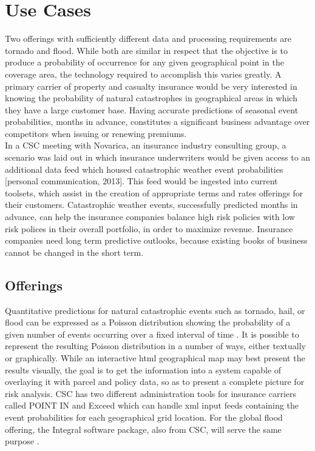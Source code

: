 \section{Use Cases}
Two offerings with sufficiently different data and processing requirements are tornado and flood. While both are similar in  respect that the objective is to produce a probability of occurrence for any given geographical point in the coverage area, the technology required to accomplish this varies greatly. A primary carrier of property and casualty insurance would be very interested in knowing the probability of natural catastrophes in geographical areas in which they have a large customer base. Having accurate predictions of seasonal event probabilities, months in advance, constitutes a significant business advantage over competitors when issuing or renewing premiums. \\

In a \textsc{CSC} meeting with Novarica, an insurance industry consulting group, a scenario was laid out in which insurance underwriters would be given access to an additional data feed which housed catastrophic weather event probabilities [personal communication, 2013]. This feed would be ingested into current toolsets, which assist in the creation of appropriate terms and rates offerings for their customers. Catastrophic weather events, successfully predicted months in advance, can help the insurance companies balance high risk policies with low risk polices in their overall portfolio, in order to maximize revenue.  Insurance companies need long term predictive outlooks, because existing books of business cannot be changed in the short term.
\subsection{Offerings}
Quantitative predictions for natural catastrophic events such as tornado, hail, or flood can be expressed as a Poisson distribution showing the probability of a given number of events occurring over a fixed interval of time \cite{anderson}. It is possible to represent the resulting Poisson distribution in a number of ways, either textually or graphically. While an interactive \gls{html} geographical map may best present the results visually, the goal is to get the information into a system capable of overlaying it with parcel and policy data, so as to present a complete picture for risk analysis. \textsc{CSC} has two different administration tools for insurance carriers called POINT IN \cite{point_in} and Exceed \cite{exceed} which can handle \gls{xml} input feeds containing the event probabilities for each geographical grid location. For the global flood offering, the Integral software package, also from \textsc{CSC}, will serve the same purpose \cite{integral}.
